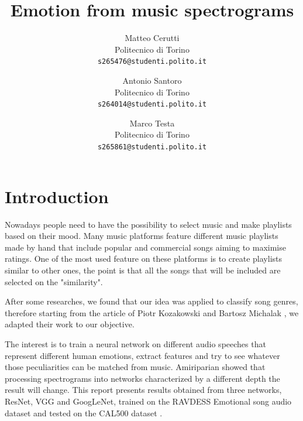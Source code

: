 \documentclass[10pt,twocolumn,letterpaper]{article}
\begin{document}
\title{Emotion from music spectrograms}

\author{Matteo Cerutti\\
Politecnico di Torino\\
{\tt\small s265476@studenti.polito.it}
\and
Antonio Santoro\\
Politecnico di Torino\\
{\tt\small s264014@studenti.polito.it}
\and
Marco Testa\\
Politecnico di Torino\\
{\tt\small s265861@studenti.polito.it}
}


\maketitle

\begin{abstract}
   
\end{abstract}

\section{Introduction}

Nowadays people need to have the possibility to select music and make playlists based on their mood. Many music platforms feature different music playlists made by hand that include popular and commercial songs aiming to maximise ratings. One of the most used feature on these platforms is to create playlists similar to other ones, the point is that all the songs that will be included are selected on the "similarity".

After some researches, we found that our idea was applied to classify song genres, therefore starting from the article of Piotr Kozakowski and Bartosz Michalak \cite{Kozakowski}, we adapted their work to our objective.

The interest is to train a neural network on different audio speeches that represent different human emotions, extract features and try to see whatever those peculiarities can be matched from music. Amiriparian \etal \cite{Amiriparian} showed that processing spectrograms into networks characterized by a different depth the result will change. This report presents results obtained from three networks, ResNet, VGG and GoogLeNet, trained on the RAVDESS Emotional song audio dataset \cite{Ravdess} and tested on the CAL500 dataset \cite{CAL500}.
\end{document}
